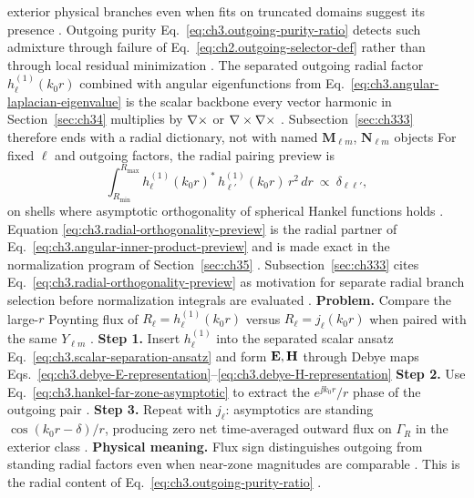 exterior physical branches even when fits on truncated domains suggest its presence .
Outgoing purity Eq.~\eqref{eq:ch3.outgoing-purity-ratio} detects such admixture through failure of
Eq.~\eqref{eq:ch2.outgoing-selector-def} rather than through local residual minimization .
The separated outgoing radial factor \(h_{\ell}^{(1)}(k_{0}r)\) combined with angular eigenfunctions from
Eq.~\eqref{eq:ch3.angular-laplacian-eigenvalue} is the scalar backbone every vector harmonic in
Section~\ref{sec:ch34} multiplies by \(\nabla\times\) or \(\nabla\times\nabla\times\) . Subsection~\ref{sec:ch333}
therefore ends with a radial dictionary, not with named \(\mathbf{M}_{\ell m}\), \(\mathbf{N}_{\ell m}\) objects
For fixed \(\ell\) and outgoing factors, the radial pairing preview is
\begin{equation}
\label{eq:ch3.radial-orthogonality-preview}
\int_{R_{\min}}^{R_{\max}}
h_{\ell}^{(1)}(k_{0}r)^{*}\,h_{\ell'}^{(1)}(k_{0}r)\,r^{2}\,dr
\ \propto\
\delta_{\ell\ell'},
\end{equation}
on shells where asymptotic orthogonality of spherical Hankel functions holds . Equation
\eqref{eq:ch3.radial-orthogonality-preview} is the radial partner of
Eq.~\eqref{eq:ch3.angular-inner-product-preview} and is made exact in the normalization program of
Section~\ref{sec:ch35} . Subsection~\ref{sec:ch333} cites
Eq.~\eqref{eq:ch3.radial-orthogonality-preview} as motivation for separate radial branch selection before
normalization integrals are evaluated .
\textbf{Problem.} Compare the large-\(r\) Poynting flux of \(R_{\ell}=h_{\ell}^{(1)}(k_{0}r)\) versus
\(R_{\ell}=j_{\ell}(k_{0}r)\) when paired with the same \(Y_{\ell m}\) .
\textbf{Step 1.} Insert \(h_{\ell}^{(1)}\) into the separated scalar ansatz Eq.~\eqref{eq:ch3.scalar-separation-ansatz}
and form \(\mathbf{E},\mathbf{H}\) through Debye maps Eqs.~\eqref{eq:ch3.debye-E-representation}--\eqref{eq:ch3.debye-H-representation}
\textbf{Step 2.} Use Eq.~\eqref{eq:ch3.hankel-far-zone-asymptotic} to extract the \(e^{\jj k_{0}r}/r\) phase of the
outgoing pair .
\textbf{Step 3.} Repeat with \(j_{\ell}\): asymptotics are standing \(\cos(k_{0}r-\delta)/r\), producing zero
net time-averaged outward flux on \(\Gamma_R\) in the exterior class .
\textbf{Physical meaning.} Flux sign distinguishes outgoing from standing radial factors even when near-zone
magnitudes are comparable . This is the radial content of
Eq.~\eqref{eq:ch3.outgoing-purity-ratio} .
